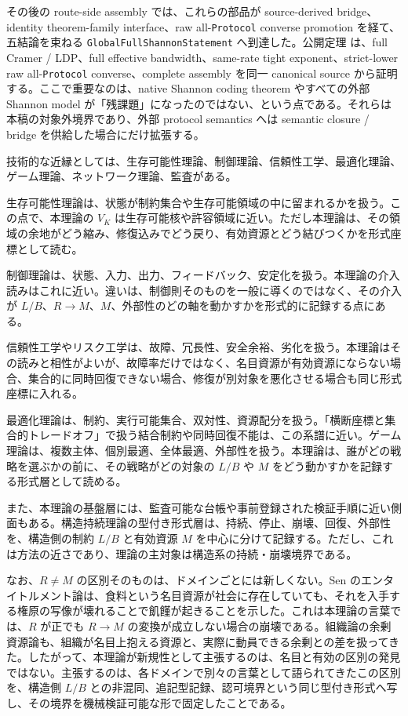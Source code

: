 \documentclass[12pt,a4paper]{article}
\begin{document}
その後の route-side assembly では、これらの部品が source-derived bridge、identity theorem-family interface、raw all-\texttt{Protocol} converse promotion を経て、五結論を束ねる \texttt{GlobalFullShannonStatement} へ到達した。公開定理 {\scriptsize{}} は、full Cramer / LDP、full effective bandwidth、same-rate tight exponent、strict-lower raw all-\texttt{Protocol} converse、complete assembly を同一 canonical source から証明する。ここで重要なのは、native Shannon coding theorem やすべての外部 Shannon model が「残課題」になったのではない、という点である。それらは本稿の対象外境界であり、外部 protocol semantics へは semantic closure / bridge を供給した場合にだけ拡張する。

技術的な近縁としては、生存可能性理論、制御理論、信頼性工学、最適化理論、ゲーム理論、ネットワーク理論、監査がある。

生存可能性理論は、状態が制約集合や生存可能領域の中に留まれるかを扱う。この点で、本理論の \(V_K\) は生存可能核や許容領域に近い。ただし本理論は、その領域の余地がどう縮み、修復込みでどう戻り、有効資源とどう結びつくかを形式座標として読む。

制御理論は、状態、入力、出力、フィードバック、安定化を扱う。本理論の介入読みはこれに近い。違いは、制御則そのものを一般に導くのではなく、その介入が \(L/B\)、\(R\to M\)、\(M\)、外部性のどの軸を動かすかを形式的に記録する点にある。

信頼性工学やリスク工学は、故障、冗長性、安全余裕、劣化を扱う。本理論はその読みと相性がよいが、故障率だけではなく、名目資源が有効資源にならない場合、集合的に同時回復できない場合、修復が別対象を悪化させる場合も同じ形式座標に入れる。

最適化理論は、制約、実行可能集合、双対性、資源配分を扱う。「横断座標と集合的トレードオフ」で扱う結合制約や同時回復不能は、この系譜に近い。ゲーム理論は、複数主体、個別最適、全体最適、外部性を扱う。本理論は、誰がどの戦略を選ぶかの前に、その戦略がどの対象の \(L/B\) や \(M\) をどう動かすかを記録する形式層として読める。

また、本理論の基盤層には、監査可能な台帳や事前登録された検証手順に近い側面もある。構造持続理論の型付き形式層は、持続、停止、崩壊、回復、外部性を、構造側の制約 \(L/B\) と有効資源 \(M\) を中心に分けて記録する。ただし、これは方法の近さであり、理論の主対象は構造系の持続・崩壊境界である。

なお、\(R\neq M\) の区別そのものは、ドメインごとには新しくない。Sen のエンタイトルメント論は、食料という名目資源が社会に存在していても、それを入手する権原の写像が壊れることで飢饉が起きることを示した。これは本理論の言葉では、\(R\) が正でも \(R\to M\) の変換が成立しない場合の崩壊である。組織論の余剰資源論も、組織が名目上抱える資源と、実際に動員できる余剰との差を扱ってきた。したがって、本理論が新規性として主張するのは、名目と有効の区別の発見ではない。主張するのは、各ドメインで別々の言葉として語られてきたこの区別を、構造側 \(L/B\) との非混同、追記型記録、認可境界という同じ型付き形式へ写し、その境界を機械検証可能な形で固定したことである。
\end{document}
